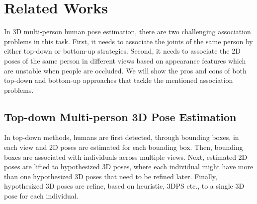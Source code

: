 
\chapter{Related Works}\label{chapter:introduction}
In 3D multi-person human pose estimation, there are two challenging association problems in this task. First, it needs to associate the joints of the same person by either top-down or bottom-up strategies. Second, it needs to associate the 2D poses of the same person in different views based on appearance features which are unstable when people are occluded. We will show the pros and cons of both top-down and bottom-up approaches that tackle the mentioned association problems.
\section{Top-down Multi-person 3D Pose Estimation}
In top-down methods, humans are first detected, through bounding boxes, in
each view and 2D poses are estimated for each bounding box. Then, bounding boxes
are associated with individuals across multiple views. Next, estimated 2D poses are lifted to hypothesized 3D poses, where each individual might have more than one hypothesized 3D poses that need to be refined later. Finally, hypothesized 3D poses are refine, based on heuristic, 3DPS etc., to a single 3D pose for each individual.

